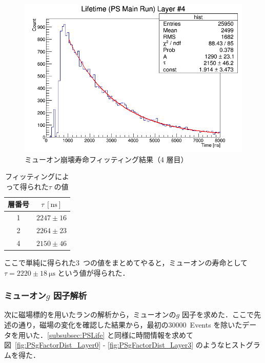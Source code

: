 \begin{figure}[h]
\begin{minipage}{0.45\textwidth}
	\includegraphics[width = \textwidth]{figure/odagawa/PSLifetimeFit_Layer3.png}
	\caption{ミューオン崩壊寿命フィッティング結果（4 層目）}
	\label{fig:PSLifeFit_Layer3}
	\end{minipage}
\end{figure}%

\begin{table}[h]
	\centering
	\caption{フィッティングによって得られた$\tau$ の値}
	\begin{tabular}{cc}\toprule
	層番号 & $\tau~[\mathrm{ns}]$ \\ \midrule
	1 & $2247 \pm 16$ \\
	2 & $2264 \pm 23$ \\
	4 & $2150 \pm 46$ \\ \bottomrule
	\end{tabular}\label{tab:PSLifetime}
\end{table}%

ここで単純に得られた3~つの値をまとめてやると，ミューオンの寿命として$\tau = 2220 \pm 18~\mathrm{\mu s}$ という値が得られた．

\newpage

\subsubsection{ミューオン$g$ 因子解析}
\label{subsubsec:PSgFactor}
次に磁場標的を用いたランの解析から，ミューオンの$g$ 因子を求めた．ここで先述の通り，磁場の変化を確認した結果から，最初の30000~Events を除いたデータを用いた．\ref{subsubsec:PSLife} と同様に時間情報を求めて図~\ref{fig:PSgFactorDist_Layer0} - \ref{fig:PSgFactorDist_Layer3} のようなヒストグラムを得た．

